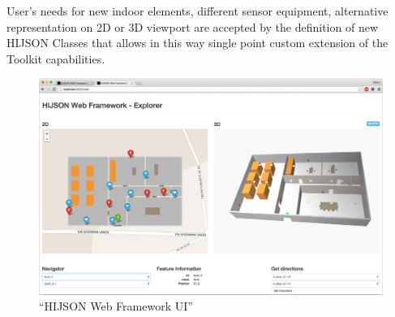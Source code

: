 User's needs for new indoor elements, different sensor equipment,
alternative representation on 2D or 3D viewport are accepted by the
definition of new HIJSON Classes that allows in this way single point
custom extension of the Toolkit capabilities.


\begin{figure}[htb]
\centering
\includegraphics[width=\textwidth]{images/web-framework.png}
\caption{``HIJSON Web Framework UI''}
\label{fig:web-framework-ui}
\end{figure}
